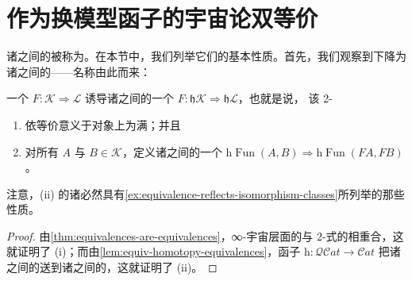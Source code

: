 \providecommand{\Fun}{\operatorname{Fun}}
\providecommand{\QCat}{\mathcal{Q}\mathcal{C}at}
\providecommand{\Cat}{\mathcal{C}at}
\providecommand{\hFun}{\mathrm{h}\Fun} %
\providecommand{\HomB}{\mathrm{Hom}_{B}}
\providecommand{\HomFB}{\mathrm{Hom}_{FB}}
\providecommand{\SWarrow}{\rotatebox[origin=c]{-135}{$\Rightarrow$}} %
\providecommand{\Disc}{\mathit{Disc}}
\providecommand{\Stab}{\mathcal{S}\mathit{tab}} %
\providecommand{\Rari}{\mathit{Rari}}
\providecommand{\Lari}{\mathit{Lari}}
\providecommand{\Cart}{\mathcal{C}\mathit{art}}
\providecommand{\CoCart}{\mathit{co}\mathcal{C}\mathit{art}}
\providecommand{\Fib}{\mathcal{F}\mathit{ib}}
\providecommand{\Mod}{\mathbb{M}od}
\providecommand{\hTwoCell}[5]{\tikz[baseline=-0.8ex]{%
  \node (rvl) at (0,0) {$#1$};
  \node (rvr) at (2.9,0) {$#2$};
  \draw[->] (rvl) to[bend left=28] node[above]{$\scriptstyle #3$} (rvr);
  \draw[->] (rvl) to[bend right=28] node[below]{$\scriptstyle #5$} (rvr);
  \node at (1.45,0) {$\scriptstyle #4$};}}

\section{作为换模型函子的宇宙论双等价}\label{sec:cosmological-biequivalences-as-change-of-model-functors}

诸\trInfinityCosmos{}之间的\trBiequivalence{}被称为\trChangeOfModel{}\trFunctor。在本节中，我们列举它们的基本性质。首先，我们观察到\trCosmologicalBiequivalence{}下降为诸\trHomotopyTwoCategory{}之间的\trBiequivalence——名称由此而来：

\begin{proposition}\label{prop:homotopy-two-category-biequivalence}
一个\trCosmologicalBiequivalence{} $F\colon\mathcal{K}\Rightarrow\mathcal{L}$
诱导诸\trHomotopyTwoCategory{}之间的一个\trBiequivalence{}
$F\colon\mathfrak{h}\mathcal{K}\Rightarrow\mathfrak{h}\mathcal{L}$，也就是说，
该 2-\trFunctor
\begin{enumerate}[label=(\roman*)]
\item 依等价意义于对象上为满；并且
\item 对所有 $A$ 与 $B\in\mathcal{K}$，定义诸\trCategory{}之间的一个\trLocalEquivalence
  $\hFun(A,B)\Rightarrow\hFun(FA,FB)$。
\end{enumerate}
\end{proposition}

注意，(ii) 的诸\trLocalEquivalence{}必然具有\cref{ex:equivalence-reflects-isomorphism-classes}所列举的那些性质。

\begin{proof}
由\cref{thm:equivalences-are-equivalences}，∞-宇宙层面的\trEquivalence{}与%
2-\trCategory{}式的\trEquivalence{}相重合，这就证明了 (i)；而由\cref{lem:equiv-homotopy-equivalences}，\trHomotopyCategory{}函子
$\mathrm{h}\colon\QCat\to\Cat$ 把诸\trQuasiCategory{}之间的\trEquivalence{}送到诸\trCategory{}之间的\trEquivalence，这就证明了 (ii)。
\end{proof}

